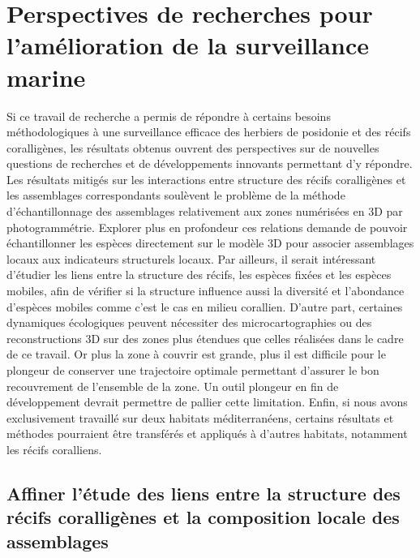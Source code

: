 \section{Perspectives de recherches pour l’amélioration de la surveillance marine}\label{discussion.3}

Si ce travail de recherche a permis de répondre à certains besoins méthodologiques à une surveillance efficace des herbiers de posidonie et des récifs coralligènes, les résultats obtenus ouvrent des perspectives sur de nouvelles questions de recherches et de développements innovants permettant d’y répondre. Les résultats mitigés sur les interactions entre structure des récifs coralligènes et les assemblages correspondants soulèvent le problème de la méthode d’échantillonnage des assemblages relativement aux zones numérisées en 3D par photogrammétrie. Explorer plus en profondeur ces relations demande de pouvoir échantillonner les espèces directement sur le modèle 3D pour associer assemblages locaux aux indicateurs structurels locaux. Par ailleurs, il serait intéressant d’étudier les liens entre la structure des récifs, les espèces fixées et les espèces mobiles, afin de vérifier si la structure influence aussi la diversité et l’abondance d’espèces mobiles comme c’est le cas en milieu corallien. D’autre part, certaines dynamiques écologiques peuvent nécessiter des microcartographies ou des reconstructions 3D sur des zones plus étendues que celles réalisées dans le cadre de ce travail. Or plus la zone à couvrir est grande, plus il est difficile pour le plongeur de conserver une trajectoire optimale permettant d’assurer le bon recouvrement de l’ensemble de la zone. Un outil plongeur en fin de développement devrait permettre de pallier cette limitation. Enfin, si nous avons exclusivement travaillé sur deux habitats méditerranéens, certains résultats et méthodes pourraient être transférés et appliqués à d’autres habitats, notamment les récifs coralliens.

\subsection{Affiner l’étude des liens entre la structure des récifs coralligènes et la composition locale des assemblages}

